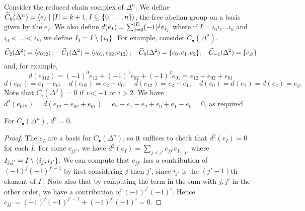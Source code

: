 \begin{example}
	Consider the reduced chain complex of \( \Delta^n \).
	We define \( \widetilde C_k(\Delta^n) = \left\langle{} e_I \mid \abs{I} = k + 1, I \subseteq \qty{0, \dots, n} \right\rangle \), the free abelian group on a basis given by the \( e_I \).
	We also define \( d(e_I) = \sum_{j=0}^{\abs{I}} (-1)^j e_{I_{\hat\jmath}} \) where if \( I = i_0 i_1 \dots i_k \) and \( i_0 < \dots < i_k \), we define \( I_{\hat\jmath} = I \setminus \qty{i_j} \).
	For example, consider \( \widetilde C_\bullet(\Delta^2) \).
	\[ \widetilde C_2(\Delta^2) = \left\langle{} e_{012} \right\rangle;\quad \widetilde C_1(\Delta^2) = \left\langle{} e_{01}, e_{02}, e_{12} \right\rangle;\quad \widetilde C_0(\Delta^2) = \qty{e_0, e_1, e_2};\quad \widetilde C_{-1}(\Delta^2) = \qty{e_\varnothing} \]
	and, for example,
	\[ d(e_{012}) = (-1)^0 e_{12} + (-1)^1 e_{02} + (-1)^2 e_{01} = e_{12} - e_{02} + e_{01} \]
	\[ d(e_{01}) = e_1 - e_0;\quad d(e_{02}) = e_2 - e_0;\quad d(e_{12}) = e_2 - e_1;\quad d(e_0) = d(e_1) = d(e_2) = e_\varnothing \]
	Note that \( \widetilde C_i(\Delta^2) = 0 \) if \( i < -1 \) or \( i > 2 \).
	We have \( d^2(e_{012}) = d(e_{12} - e_{02} + e_{01}) = e_2 - e_1 - e_2 + e_0 + e_1 - e_0 = 0 \), as required.
	\begin{center}
	\end{center}
\end{example}
\begin{proposition}
	For \( \widetilde C_\bullet(\Delta^n) \), \( d^2 = 0 \).
\end{proposition}
\begin{proof}
	The \( e_I \) are a basis for \( \widetilde C_\bullet(\Delta^n) \), so it suffices to check that \( d^2(e_I) = 0 \) for each \( I \).
	For some \( c_{jj'} \), we have \( d^2(e_I) = \sum_{j<j'} c_{jj'} e_{I_{\hat\jmath,\hat\jmath'}} \) where \( I_{\hat\jmath,\hat\jmath'} = I \setminus \qty{i_j, i_{j'}} \).
	We can compute that \( c_{jj'} \) has a contribution of \( (-1)^j (-1)^{j' - 1} \) by first considering \( j \) then \( j' \), since \( i_{j'} \) is the \( (j'-1) \)th element of \( I_{\hat\jmath} \).
	Note also that by computing the term in the sum with \( j, j' \) in the other order, we have a contribution of \( (-1)^{j'} (-1)^i \).
	Hence \( c_{jj'} = (-1)^j (-1)^{j'-1} + (-1)^{j'} (-1)^i = 0 \).
\end{proof}
